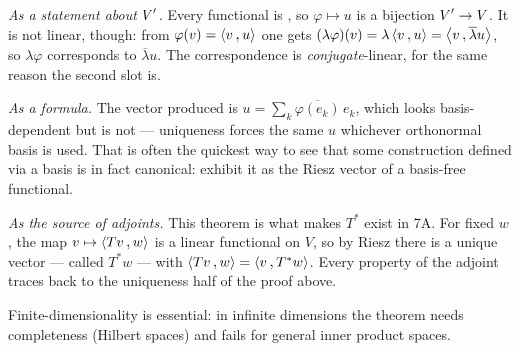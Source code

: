 \begin{ainote}
  \emph{As a statement about $\displaystyle V'$.} Every functional is , so $\varphi \mapsto u$ is a bijection $\displaystyle V' \to V$. It is not linear, though: from $\varphi(v) = \ip{v}{u}$ one gets $(\lambda\varphi)(v) = \lambda\ip{v}{u} = \ip{v}{\overline{\lambda} u}$, so $\lambda \varphi$ corresponds to $\overline{\lambda}u$. The correspondence is \emph{conjugate}-linear, for the same reason the second slot is.

  \emph{As a formula.} The vector produced is $u = \sum_k \overline{\varphi(e_k)}\,e_k$, which looks basis-dependent but is not --- uniqueness forces the same $u$ whichever orthonormal basis is used. That is often the quickest way to see that some construction defined via a basis is in fact canonical: exhibit it as the Riesz vector of a basis-free functional.

  \emph{As the source of adjoints.} This theorem is what makes $T^*$ exist in 7A. For fixed $w$, the map $v \mapsto \ip{Tv}{w}$ is a linear functional on $V$, so by Riesz there is a unique vector --- called $T^*w$ --- with $\ip{Tv}{w} = \ip{v}{T^*w}$. Every property of the adjoint traces back to the uniqueness half of the proof above.

  Finite-dimensionality is essential: in infinite dimensions the theorem needs completeness (Hilbert spaces) and fails for general inner product spaces.
\end{ainote}